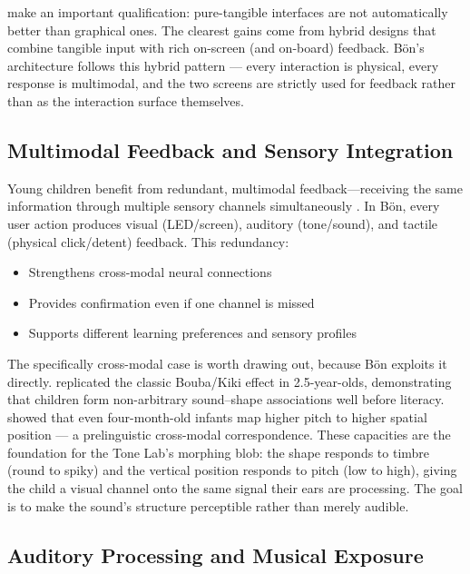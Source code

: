 \documentclass[12pt, a4paper]{article}
\newcommand{\Bodn}{B\"o\dh{}n}
\begin{document}
\citet{horn2012hybrid} make an important qualification: pure-tangible
interfaces are not automatically better than graphical ones. The clearest gains
come from hybrid designs that combine tangible input with rich on-screen (and
on-board) feedback. \Bodn{}'s architecture follows this hybrid pattern ---
every interaction is physical, every response is multimodal, and the two
screens are strictly used for feedback rather than as the interaction surface
themselves.

\subsection{Multimodal Feedback and Sensory Integration}
\label{sec:multimodal}

Young children benefit from redundant, multimodal feedback---receiving the same
information through multiple sensory channels simultaneously
\citep{price2003tangibles}. In \Bodn{}, every user action produces visual
(LED/screen), auditory (tone/sound), and tactile (physical click/detent)
feedback. This redundancy:

\begin{itemize}[noitemsep]
  \item Strengthens cross-modal neural connections
  \item Provides confirmation even if one channel is missed
  \item Supports different learning preferences and sensory profiles
\end{itemize}

The specifically cross-modal case is worth drawing out, because \Bodn{} exploits
it directly. \citet{maurer2006shape} replicated the classic Bouba/Kiki effect
in 2.5-year-olds, demonstrating that children form non-arbitrary
sound--shape associations well before literacy. \citet{dolscheid2014thickness}
showed that even four-month-old infants map higher pitch to higher spatial
position --- a prelinguistic cross-modal correspondence. These capacities are
the foundation for the Tone Lab's morphing blob: the shape responds to timbre
(round to spiky) and the vertical position responds to pitch (low to high),
giving the child a visual channel onto the same signal their ears are
processing. The goal is to make the sound's structure perceptible rather than
merely audible.

\subsection{Auditory Processing and Musical Exposure}
\label{sec:auditory}
\end{document}
